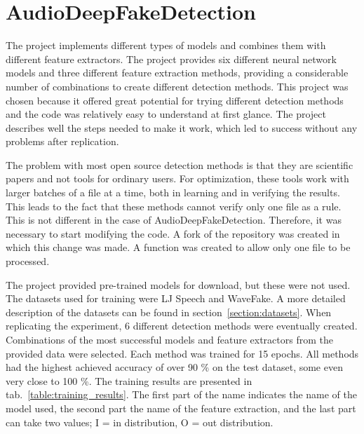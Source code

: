 \section{AudioDeepFakeDetection}

The project implements different types of models and combines them with different feature extractors. The project provides six different neural network models and three different feature extraction methods, providing a considerable number of combinations to create different detection methods. This project was chosen because it offered great potential for trying different detection methods and the code was relatively easy to understand at first glance. The project describes well the steps needed to make it work, which led to success without any problems after replication.

The problem with most open source detection methods is that they are scientific papers and not tools for ordinary users. For optimization, these tools work with larger batches of a file at a time, both in learning and in verifying the results. This leads to the fact that these methods cannot verify only one file as a rule. This is not different in the case of AudioDeepFakeDetection. Therefore, it was necessary to start modifying the code. A fork of the repository was created in which this change was made. A function was created to allow only one file to be processed.

The project provided pre-trained models for download, but these were not used. The datasets used for training were LJ Speech and WaveFake. A more detailed description of the datasets can be found in section~\ref{section:datasets}. When replicating the experiment, 6 different detection methods were eventually created. Combinations of the most successful models and feature extractors from the provided data were selected. Each method was trained for 15 epochs. All methods had the highest achieved accuracy of over 90 \% on the test dataset, some even very close to 100 \%. The training results are presented in tab.~\ref{table:training_results}. The first part of the name indicates the name of the model used, the second part the name of the feature extraction, and the last part can take two values; I = in distribution, O = out distribution.

